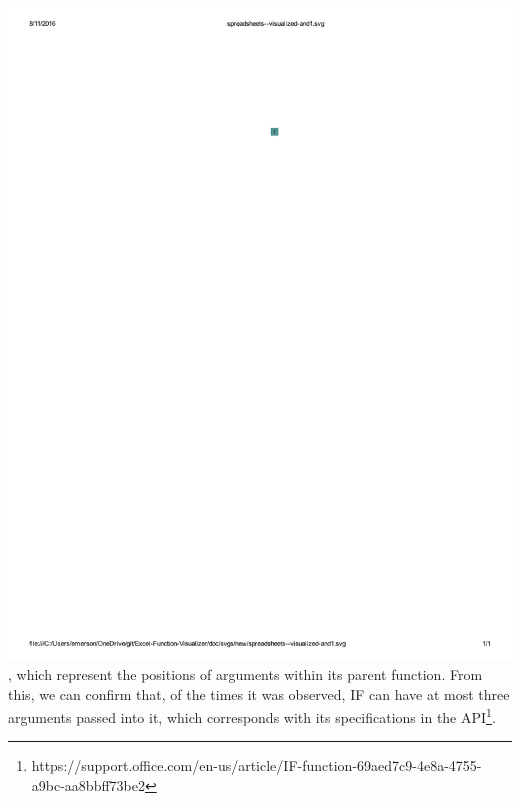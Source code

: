 \documentclass[conference]{IEEEtran}
\begin{document}
	\includegraphics{glossary-blue}, which represent the positions of arguments
	within its parent function. From this, we can confirm that, of the times it was
	observed, IF can have at most three arguments passed into it, which corresponds
	with its specifications in the
	API\footnote{https://support.office.com/en-us/article/IF-function-69aed7c9-4e8a-4755-a9bc-aa8bbff73be2}. \par
	
\end{document}
